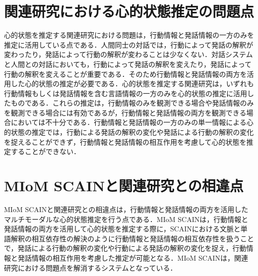 \section{関連研究における心的状態推定の問題点}
\par
心的状態を推定する関連研究における問題は，行動情報と発話情報の一方のみを推定に活用している点である．人間同士の対話では，行動によって発話の解釈が変わったり，発話によって行動の解釈が変わることは少なくない．対話システムと人間との対話においても，行動によって発話の解釈を変えたり，発話によって行動の解釈を変えることが重要である．そのため行動情報と発話情報の両方を活用した心的状態の推定が必要である．心的状態を推定する関連研究は，いずれも行動情報もしくは発話情報を含む言語情報の一方のみを心的状態の推定に活用したものである．これらの推定は，行動情報のみを観測できる場合や発話情報のみを観測できる場合には有効であるが，行動情報と発話情報の両方を観測できる場合においては不十分である．行動情報と発話情報の一方のみの単一情報による心的状態の推定では，行動による発話の解釈の変化や発話による行動の解釈の変化を捉えることができず，行動情報と発話情報の相互作用を考慮して心的状態を推定することができない．


\section{MIoM SCAINと関連研究との相違点}
\par
MIoM SCAINと関連研究との相違点は，行動情報と発話情報の両方を活用したマルチモーダルな心的状態推定を行う点である．MIoM SCAINは，行動情報と発話情報の両方を活用して心的状態を推定する際に，SCAINにおける文脈と単語解釈の相互依存性の解決のように行動情報と発話情報の相互依存性を扱うことで，発話による行動の解釈の変化や行動による発話の解釈の変化を捉え，行動情報と発話情報の相互作用を考慮した推定が可能となる．MIoM SCAINは，関連研究における問題点を解消するシステムとなっている．
